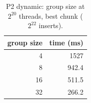 \begin{table}[H]\centering\small
\caption{P2 dynamic: group size at $2^{20}$ threads, best chunk ($2^{22}$ inserts).}\label{tab:p2dyngroup}
\begin{tabular}{rr}
\toprule
group size & time (ms) \\
\midrule
4 & 1527 \\
8 & 942.4 \\
16 & 511.5 \\
32 & 266.2 \\
\bottomrule
\end{tabular}
\end{table}
